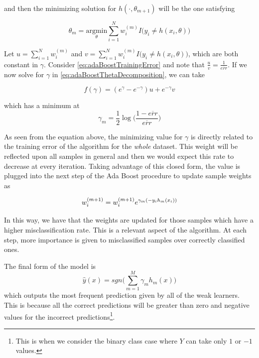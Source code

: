 and then the minimizing solution for $h(\cdot, \theta_{m+1})$ will be the one satisfying

\begin{equation}\label{eq:adaBoostThetaMinimization}
\theta_{m} = \underset{ \theta}{\mathrm{argmin}} \sum_{i=1}^{N} w_i^{(m)} I \big( y_i \neq h(x_i,\theta)  \big)
\end{equation}

Let $u = \sum_{i=1}^{N} w_i^{(m)}$ and $v = \sum_{i=1}^{N} w_i^{(m)} I \big( y_i \neq h(x_i,\theta)  \big) $, which are both constant in $\gamma$. 
Consider \cref{eq:adaBoostTrainingError} and note that $\frac{u}{v} = \frac{1}{\overline{err}}$. 
If we now solve for $\gamma$ in \cref{eq:adaBoostThetaDecomposition}, we can take

\begin{equation}\label{eq:adaBoostBetaMinimization}
f(\gamma) = ( e^{\gamma} - e^{-\gamma}) u + e^{-\gamma}v
\end{equation}

which has a minimum at
\begin{equation}
\gamma_{m} = \frac{1}{2} \log\big( \frac{1 - \overline{err} }{ \overline{err} } \big)
\end{equation}

As seen from the equation above, the minimizing value for $\gamma$ is directly related to the training error of the algorithm for the \textit{whole} dataset. 
This weight will be reflected upon all samples in general and then we would expect this rate to decrease at every iteration. 
Taking advantage of this closed form, the value is plugged into the next step of the Ada Boost procedure to update sample weights as

\begin{equation}
w_i^{(m+1)} =  w_i^{(m+1)} e^{\gamma_m(-y_i h_m(x_i))} \\
\end{equation}

In this way, we have that the weights are updated for those samples which have a higher misclassification rate. 
This is a relevant aspect of the algorithm. 
At each step, more importance is given to misclassified samples over correctly classified ones.



The final form of the model is
\begin{equation}
 \hat{y}(x) = sgn\big( \sum_{m=1}^{M} \gamma_m h_m(x) \big)
\end{equation}
  which outputs the most frequent prediction given by all of the weak learners. 
  This is because all the correct predictions will be greater than zero and negative values for the incorrect predictions\footnote{This is when we consider the binary class case where $Y$ can take only $1$ or $-1$ values.}.

